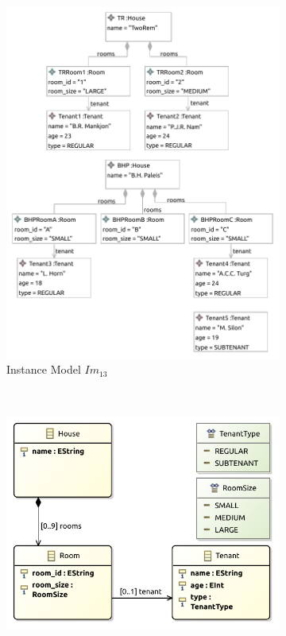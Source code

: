 \begin{figure}[p]
    \centering
    \begin{subfigure}{0.98\textwidth}
        \centering
        \includegraphics{images/06_application/instance_model/step13.pdf}
        \caption{Instance Model $Im_{13}$}
        \label{fig:application:building_the_model:room_tenant_relationship:ecore:instance_model}
    \end{subfigure}
    \\
    \begin{subfigure}{0.98\textwidth}
        \centering
        \includegraphics{images/06_application/type_model/step13.pdf}

\end{subfigure}
\end{figure}
